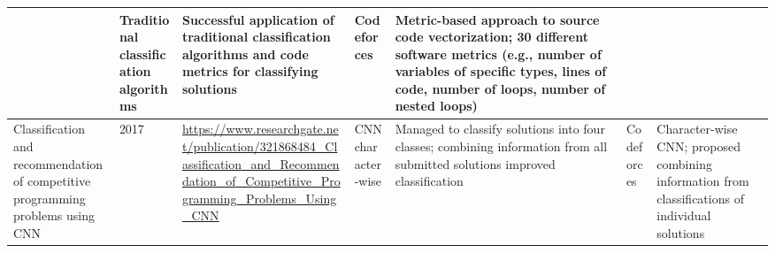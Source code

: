 \documentclass{article}
\begin{document}
\begin{itemize}
\begin{longtable}{|p{2cm}|p{0.8cm}|p{2cm}|p{2cm}|p{3cm}|p{2cm}|p{3cm}|}
              
              
                             & Traditional classification algorithms 
                             & Successful application of traditional classification algorithms and code metrics for classifying solutions 
                             & Codeforces 
                             & Metric-based approach to source code vectorization; 30 different software metrics (e.g., number of variables of specific types, lines of code, number of loops, number of nested loops)                                                                                                                                                                                                                \\
              
              \hline
              Classification and recommendation of competitive programming problems
              using CNN
                             & 2017
                             & \href{https://www.researchgate.net/publication/321868484_Classification_and_Recommendation_of_Competitive_Programming_Problems_Using_CNN}{\url{https://www.researchgate.net/publication/321868484_Classification_and_Recommendation_of_Competitive_Programming_Problems_Using_CNN}}

              
              
              
              
              
              
                             & CNN character-wise 
                             & Managed to classify solutions into four classes; combining information from all submitted solutions improved classification 
                             & Codeforces 
                             & Character-wise CNN; proposed combining information from classifications of individual solutions                                                                                                                                                                                                                                                                                                        \\
              
              \hline
              
          \end{longtable}
          
          
\end{itemize}
\end{document}
